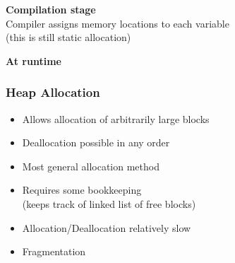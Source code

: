 \documentclass{../ucll-slides}
\newenvironment{procontralist}{
  \begingroup
  \newcommand{\pro}{\item[\Checkmark]}
  \newcommand{\con}{\item[\XSolidBrush]}
  \begin{itemize}
  }{
  \end{itemize}
  \endgroup}
\begin{document}
\begin{frame}
\begin{columns}
\begin{center}
    \end{center}
  \end{columns}
  \vskip2cm
  \begin{overprint}
    \begin{center}
      \textbf{Compilation stage} \\ Compiler assigns memory locations to each variable \\ (this is still static allocation)
    \end{center}

    \begin{center}
      \textbf{At runtime}
    \end{center}
  \end{overprint}
\end{frame}

\begin{frame}
  \frametitle{Heap Allocation}
  \begin{procontralist}
    \pro Allows allocation of arbitrarily large blocks
    \pro Deallocation possible in any order
    \pro Most general allocation method
    \con Requires some bookkeeping \\ (keeps track of linked list of free blocks)
    \con Allocation/Deallocation relatively slow
    \con Fragmentation
  \end{procontralist}
\end{frame}



\end{document}
